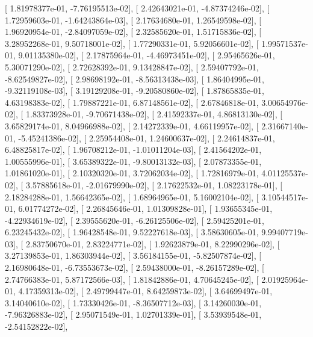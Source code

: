 \documentclass{article}
\begin{document}
       [  1.81978377e-01,  -7.76195513e-02],
       [  2.42643021e-01,  -4.87374246e-02],
       [  1.72959603e-01,  -1.64243864e-03],
       [  2.17634680e-01,   1.26549598e-02],
       [  1.96920954e-01,  -2.84097059e-02],
       [  2.32585620e-01,   1.51715836e-02],
       [  3.28952268e-01,   9.50718001e-02],
       [  1.77290331e-01,   5.92056601e-02],
       [  1.99571537e-01,   9.01135380e-02],
       [  2.17875964e-01,  -4.46973451e-02],
       [  2.95465626e-01,   5.30071290e-02],
       [  2.72628392e-01,   9.13428847e-02],
       [  2.59407792e-01,  -8.62549827e-02],
       [  2.98698192e-01,  -8.56313438e-03],
       [  1.86404995e-01,  -9.32119108e-03],
       [  3.19129208e-01,  -9.20580860e-02],
       [  1.87865835e-01,   4.63198383e-02],
       [  1.79887221e-01,   6.87148561e-02],
       [  2.67846818e-01,   3.00654976e-02],
       [  1.83373928e-01,  -9.70671438e-02],
       [  2.41592337e-01,   4.86813130e-02],
       [  3.65829174e-01,   8.04966988e-02],
       [  2.14272339e-01,   4.66119957e-02],
       [  2.31667140e-01,  -5.45241386e-02],
       [  2.25954408e-01,   1.24600637e-02],
       [  2.24614837e-01,   6.48825817e-02],
       [  1.96708212e-01,  -1.01011204e-03],
       [  2.41564202e-01,   1.00555996e-01],
       [  3.65389322e-01,  -9.80013132e-03],
       [  2.07873355e-01,   1.01861020e-01],
       [  2.10320320e-01,   3.72062034e-02],
       [  1.72816979e-01,   4.01125537e-02],
       [  3.57885618e-01,  -2.01679990e-02],
       [  2.17622532e-01,   1.08223178e-01],
       [  2.18284288e-01,   1.56642365e-02],
       [  1.68964965e-01,   5.16002104e-02],
       [  3.10544517e-01,   6.01774272e-02],
       [  2.26845646e-01,   1.01309828e-01],
       [  1.93655345e-01,  -4.22934619e-02],
       [  2.39555620e-01,  -6.26125506e-02],
       [  2.59425201e-01,   6.23245432e-02],
       [  1.96428548e-01,   9.52227618e-03],
       [  3.58630605e-01,   9.99407719e-03],
       [  2.83750670e-01,   2.83224771e-02],
       [  1.92623879e-01,   8.22990296e-02],
       [  3.27139853e-01,   1.86303944e-02],
       [  3.56184155e-01,  -5.82507874e-02],
       [  2.16980648e-01,  -6.73553673e-02],
       [  2.59438000e-01,  -8.26157289e-02],
       [  2.74766383e-01,   5.87172566e-03],
       [  1.81842886e-01,   4.70645245e-02],
       [  2.01925964e-01,   4.17359313e-02],
       [  2.49799447e-01,   8.64259873e-02],
       [  3.64699497e-01,   3.14040610e-02],
       [  1.73330426e-01,  -8.36507712e-03],
       [  3.14260030e-01,  -7.96326883e-02],
       [  2.95071549e-01,   1.02701339e-01],
       [  3.53939548e-01,  -2.54152822e-02],
\end{document}

